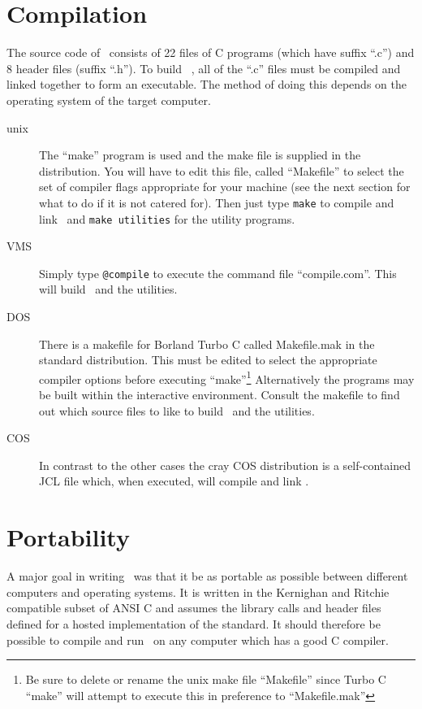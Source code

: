 \section{Compilation}%
The source code of \moldy\  consists of 22 files of C programs (which have
suffix ``.c'') and 8 header files (suffix ``.h'').
To build \moldy\ , all of the ``.c'' files must be compiled and linked
together to form an executable.  The method of doing this depends on
the operating system of the target computer.
\begin{description}
\item[unix]  The ``make'' program is used and the make file is
supplied in the distribution.  You will have to edit this file, called
``Makefile'' to select the  set of compiler flags appropriate for your
machine (see the next section for what to do if it is not catered
for). Then just type \verb'make' to compile and link \moldy\  and
\verb'make utilities' for the utility programs.

\item[VMS]  Simply type \verb'@compile' to execute the command file
``compile.com''. This will build \moldy\  and the utilities.

\item[DOS] There is a makefile for Borland Turbo C called Makefile.mak
in the standard distribution.  This must be edited to select the
appropriate compiler options before executing ``make''\footnote{Be
sure to delete or rename the unix make file ``Makefile'' since Turbo C
``make'' will attempt to execute this in preference to
``Makefile.mak''} Alternatively the programs may be built within the
interactive environment.  Consult the makefile to find out which
source files to like to build \moldy\ and the utilities.

\item[COS]  In contrast to the other cases the cray COS distribution
is a self-contained JCL  file which, when executed, will compile and
link \moldy. 
\end{description}

\section{Portability}%
A major goal in writing \moldy\ was that it be as portable as possible
between different computers  and operating systems.  It is  written in
the Kernighan and Ritchie\cite{kernighan:78} compatible subset of ANSI
C and assumes the library calls and header files  defined for a hosted
implementation of the  standard.  It  should therefore be possible  to
compile and run \moldy\ on any computer which has a good C compiler.

